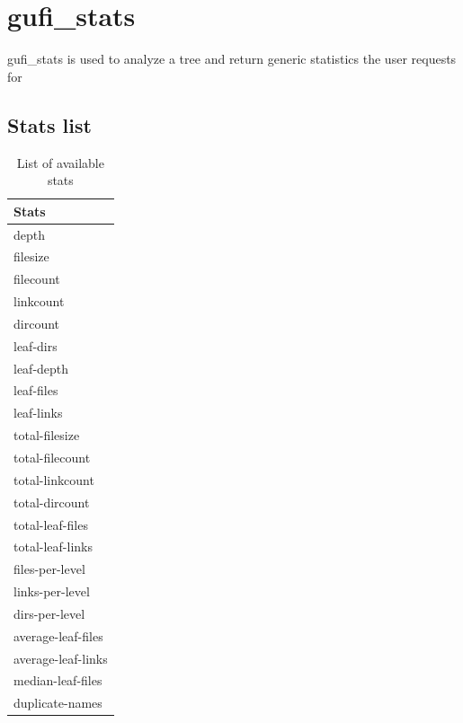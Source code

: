 \documentclass{article}
\begin{document}
\clearpage

\section{gufi\_stats}
gufi\_stats is used to analyze a tree and return generic statistics the user requests for

\subsection{Stats list}
\begin{table} [h]
\centering
\begin{tabular}{l}
Stats\\\hline
depth \\
filesize \\
filecount \\
linkcount \\
dircount \\
leaf-dirs \\
leaf-depth \\
leaf-files \\
leaf-links \\
total-filesize \\
total-filecount \\
total-linkcount \\
total-dircount \\
total-leaf-files \\
total-leaf-links \\
files-per-level \\ 
links-per-level \\
dirs-per-level \\
average-leaf-files \\
average-leaf-links \\ 
median-leaf-files \\
duplicate-names
\end{tabular}
\caption{\label{tab:widgets}List of available stats}
\end{table}
\end{document}
